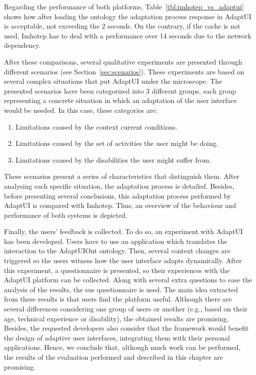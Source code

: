 Regarding the performance of both platforms, Table~\ref{tbl:imhotep_vs_adaptui}
shows how after loading the ontology the adaptation process response in AdaptUI
is acceptable, not exceeding the 2 seconds. On the contrary, if the cache is not
used, Imhotep has to deal with a performance over 14 seconds due to the network
dependency.


After these comparisons, several qualitative experiments are presented through
different scenarios (see Section~\ref{sec:scenarios}). These experiments are
based on several complex situations that put AdaptUI under the microscope.
The presented scenarios have been categorized into 3 different groups, each 
group representing a concrete situation in which an adaptation of the user 
interface would be needed. In this case, these categories are:

\begin{enumerate}[label=\alph{*}]
  \item Limitations caused by the context current conditions.
  \item Limitations caused by the set of activities the user might be doing.
  \item Limitations caused by the disabilities the user might suffer from.
\end{enumerate}

These scenarios present a series of characteristics that distinguish them. After
analysing each specific situation, the adaptation process is detailed. Besides,
before presenting several conclusions, this adaptation process performed by 
AdaptUI is compared with Imhotep. Thus, an overview of the behaviour and 
performance of both systems is depicted.

Finally, the users' feedback is collected. To do so, an experiment with AdaptUI 
has been developed. Users have to use an application which translates the 
interaction to the AdaptUIOnt ontology. Then, several context changes are 
triggered so the users witness how the user interface adapts dynamically. After 
this experiment, a questionnaire is presented, so their experiences with the 
AdaptUI platform can be collected. Along with several extra questions to ease 
the analysis of the results, the \ac{sus} questionnaire is used. The main idea 
extracted from these results is that users find the platform useful. Although 
there are several differences considering one group of users or another (e.g., 
based on their age, technical experience or disability), the obtained results 
are promising. Besides, the requested developers also consider that the 
framework would benefit the design of adaptive user interfaces, integrating them 
with their personal applications. Hence, we conclude that, although much work 
can be performed, the results of the evaluation performed and described in this 
chapter are promising.
